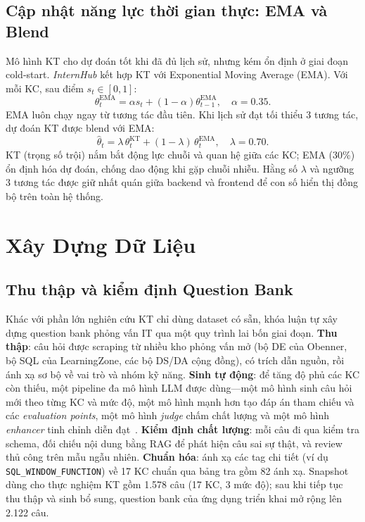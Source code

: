 \documentclass[conference]{IEEEtran}
\newcommand{\sys}{\textit{InternHub}}
\begin{document}
\subsection{Cập nhật năng lực thời gian thực: EMA và Blend}
Mô hình KT cho dự đoán tốt khi đã đủ lịch sử, nhưng kém ổn định ở giai đoạn cold-start. \sys{} kết hợp KT với Exponential Moving Average (EMA). Với mỗi KC, sau điểm $s_t\in[0,1]$:
\begin{equation}
\theta^{\text{EMA}}_t=\alpha s_t+(1-\alpha)\theta^{\text{EMA}}_{t-1},\quad \alpha=0.35.
\end{equation}
EMA luôn chạy ngay từ tương tác đầu tiên. Khi lịch sử đạt tối thiểu 3 tương tác, dự đoán KT được blend với EMA:
\begin{equation}
\hat{\theta}_t=\lambda\,\theta^{\text{KT}}_t+(1-\lambda)\,\theta^{\text{EMA}}_t,\quad \lambda=0.70.
\label{eq:blend}
\end{equation}
KT (trọng số trội) nắm bắt động lực chuỗi và quan hệ giữa các KC; EMA (30\%) ổn định hóa dự đoán, chống dao động khi gặp chuỗi nhiễu. Hằng số $\lambda$ và ngưỡng 3 tương tác được giữ nhất quán giữa backend và frontend để con số hiển thị đồng bộ trên toàn hệ thống.

\section{Xây Dựng Dữ Liệu}
\label{sec:data}

\subsection{Thu thập và kiểm định Question Bank}
Khác với phần lớn nghiên cứu KT chỉ dùng dataset có sẵn, khóa luận tự xây dựng question bank phỏng vấn IT qua một quy trình lai bốn giai đoạn. \textbf{Thu thập}: câu hỏi được scraping từ nhiều kho phỏng vấn mở (bộ DE của Obenner, bộ SQL của LearningZone, các bộ DS/DA cộng đồng), có trích dẫn nguồn, rồi ánh xạ sơ bộ về vai trò và nhóm kỹ năng. \textbf{Sinh tự động}: để tăng độ phủ các KC còn thiếu, một pipeline đa mô hình LLM được dùng---một mô hình sinh câu hỏi mới theo từng KC và mức độ, một mô hình mạnh hơn tạo đáp án tham chiếu và các \textit{evaluation points}, một mô hình \textit{judge} chấm chất lượng và một mô hình \textit{enhancer} tinh chỉnh diễn đạt~\cite{team2023gemini,brown2020language}. \textbf{Kiểm định chất lượng}: mỗi câu đi qua kiểm tra schema, đối chiếu nội dung bằng RAG để phát hiện câu sai sự thật, và review thủ công trên mẫu ngẫu nhiên. \textbf{Chuẩn hóa}: ánh xạ các tag chi tiết (ví dụ \texttt{SQL\_WINDOW\_FUNCTION}) về 17 KC chuẩn qua bảng tra gồm 82 ánh xạ. Snapshot dùng cho thực nghiệm KT gồm 1.578 câu (17 KC, 3 mức độ); sau khi tiếp tục thu thập và sinh bổ sung, question bank của ứng dụng triển khai mở rộng lên 2.122 câu.
\end{document}
